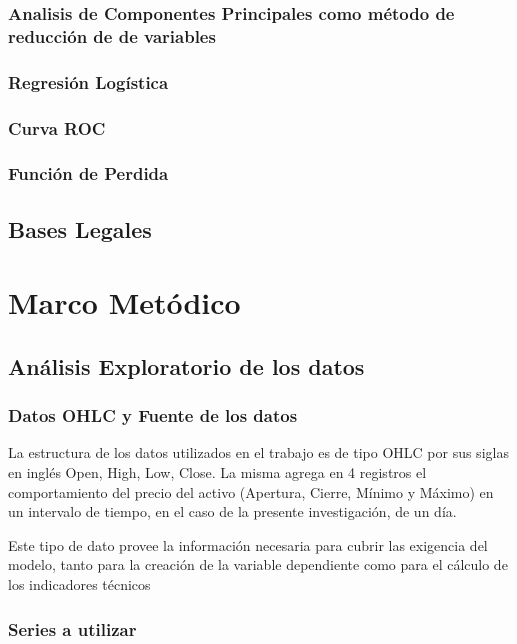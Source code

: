 \documentclass[a4paper,12pt]{Latex/Classes/PhDthesisPSnPDF}
\begin{document}
\subsection{Analisis de Componentes Principales como método de reducción de de variables}
\subsection{Regresión Logística}
\subsection{Curva ROC}
\subsection{Función de Perdida}

\section{Bases Legales}



\chapter{Marco Metódico}
\section{Análisis Exploratorio de los datos}

\subsection{Datos OHLC y Fuente de los datos}

La estructura de los datos utilizados en el trabajo es de tipo OHLC por sus siglas en inglés Open, High, Low, Close. La misma agrega en 4 registros el comportamiento del precio del activo (Apertura, Cierre, Mínimo y Máximo) en un intervalo de tiempo, en el caso de la presente investigación, de un día. 

Este tipo de dato provee la información necesaria para cubrir las exigencia del modelo, tanto para la creación de la variable dependiente como para el cálculo de los indicadores técnicos


\subsection{Series a utilizar}
\end{document}
